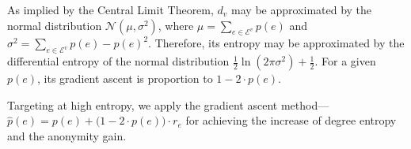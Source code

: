 \begin{theorem}
As implied by the Central Limit Theorem, $d_{v}$ may be approximated by the normal distribution $\mathcal{N}(\mu,\sigma^2)$, where $\mu=\sum_{e \in \mathcal{E}^{v}} p(e)$ and $\sigma^2=\sum_{e \in \mathcal{E}^{v}} p(e)-p(e)^2$. Therefore, its entropy may be approximated by the differential entropy of the normal distribution $\frac{1}{2} \ln(2\pi\sigma^2) + \frac{1}{2}$. For a given $p(e)$, its gradient ascent is proportion to $1-2\cdot p(e)$. 
\end{theorem}
Targeting at high entropy, we apply the gradient ascent method---$\hat{p}(e)=p(e)+ \big( 1-2\cdot p(e) \big) \cdot r_{e} $ for achieving the increase of degree entropy and the anonymity gain.

